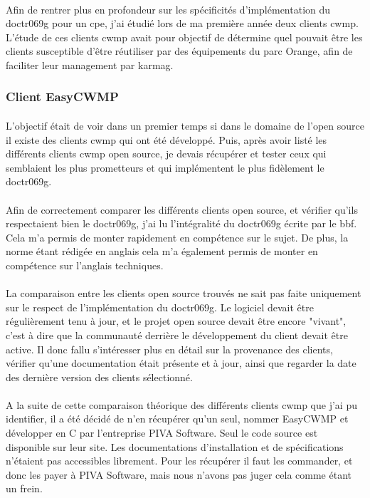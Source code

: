 \documentclass[12pt,a4paper]{report}
\begin{document}
\paragraph*{}Afin de rentrer plus en profondeur sur les spécificités d'implémentation du \gls{doctr069g} pour un \gls{cpe}, j'ai étudié lors de ma première année deux clients \gls{cwmp}. L'étude de ces clients \gls{cwmp} avait pour objectif de détermine quel pouvait être les clients susceptible d'être réutiliser par des équipements du parc Orange, afin de faciliter leur management par \gls{karmag}. \\
\subsubsection{Client EasyCWMP}
\paragraph*{}L’objectif était de voir dans un premier temps si dans le domaine de l’open source il existe des clients \gls{cwmp} qui ont été développé. Puis, après avoir listé les différents clients \gls{cwmp} open source, je devais récupérer et tester ceux qui semblaient les plus prometteurs et qui implémentent le plus fidèlement le \gls{doctr069g}.
\paragraph*{}Afin de correctement comparer les différents clients open source, et vérifier qu’ils respectaient bien le \gls{doctr069g}, j’ai lu l’intégralité du \gls{doctr069g} écrite par le \gls{bbf}. Cela m’a permis de monter rapidement en compétence sur le sujet. De plus, la norme étant rédigée en anglais cela m’a également permis de monter en compétence sur l'anglais techniques.
\paragraph*{}La comparaison entre les clients open source trouvés ne sait pas faite uniquement sur le respect de l'implémentation du \gls{doctr069g}. Le logiciel devait être régulièrement tenu à jour, et le projet open source devait être encore "vivant", c'est à dire que la communauté derrière le développement du client devait être active. Il donc fallu s'intéresser plus en détail sur la provenance des clients, vérifier qu'une documentation était présente et à jour, ainsi que regarder la date des dernière version des clients sélectionné.
\paragraph*{}A la suite de cette comparaison théorique des différents clients \gls{cwmp} que j’ai pu identifier, il a été décidé de n’en récupérer qu’un seul, nommer EasyCWMP et développer en C par l’entreprise PIVA Software. Seul le code source est disponible sur leur site. Les documentations d’installation et de spécifications n’étaient pas accessibles librement. Pour les récupérer il faut les commander, et donc les payer à PIVA Software, mais nous n'avons pas juger cela comme étant un frein.
\end{document}
